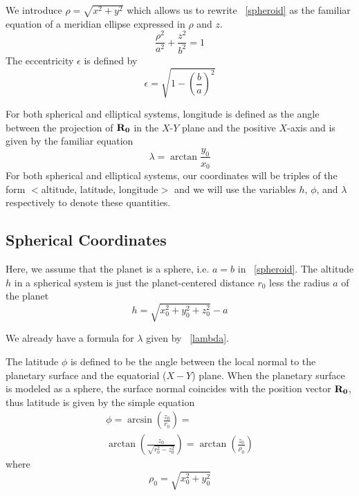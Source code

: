 \documentclass[twoside,11pt,titlepage]{report}
\begin{document}
We introduce $\rho = \sqrt{x^2+y^2}$ which allows us to rewrite ~\ref{spheroid} as the familiar equation of a meridian  ellipse expressed in $\rho$ and $z$.
\begin{equation}
\frac{\rho^2}{a^2} + \frac{z^2}{b^2} = 1
\label{spheroid2}
\end{equation}
The eccentricity $\epsilon$ is defined by
\begin{equation}
\epsilon = \sqrt{1-\left(\frac{b}{a}\right)^2}
\label{epsilon}
\end{equation}

For both spherical and elliptical systems, longitude is defined as the angle between the projection of $\bf{R_0}$ in the $X$-$Y$ plane and the positive $X$-axis and is given by the familiar equation
\begin{equation}
\lambda = \arctan\frac{y_0}{x_0}
\label{lambda}
\end{equation}
For both spherical and elliptical systems, our coordinates will be triples of the form $<$altitude, latitude, longitude$>$ and we will use the variables $h$, $\phi$, and $\lambda$ respectively to denote these quantities.

\subsection{Spherical Coordinates}
Here, we assume that the planet is a sphere, i.e. $a = b$ in ~\ref{spheroid}.
The altitude $h$ in a spherical system is just the planet-centered distance $r_0$ less the radius $a$ of the planet
\begin{equation}
h = \sqrt{x_0^2+y_0^2+z_0^2} - a
\label{hSpherical}
\end{equation}

We already have a formula for $\lambda$ given by ~\ref{lambda}.

The latitude $\phi$ is defined to be the angle between the local normal to the planetary surface and the equatorial ($X-Y$) plane.  When the planetary surface is modeled as a sphere, the surface normal coincides with the position vector $\bf{R_0}$, thus latitude is given by the simple equation
\begin{eqnarray}
\phi = \arcsin(\frac{z_0}{r_0}) = \nonumber \\
\arctan(\frac{z_0}{\sqrt{r_0^2-z_0^2}}) = \arctan(\frac{z_0}{\rho_0})
\label{latSpherical}
\end{eqnarray}
\noindent where
\begin{equation}
\rho_0 = \sqrt{x_0^2 + y_0^2}
\label{rho0}
\end{equation}
\end{document}
